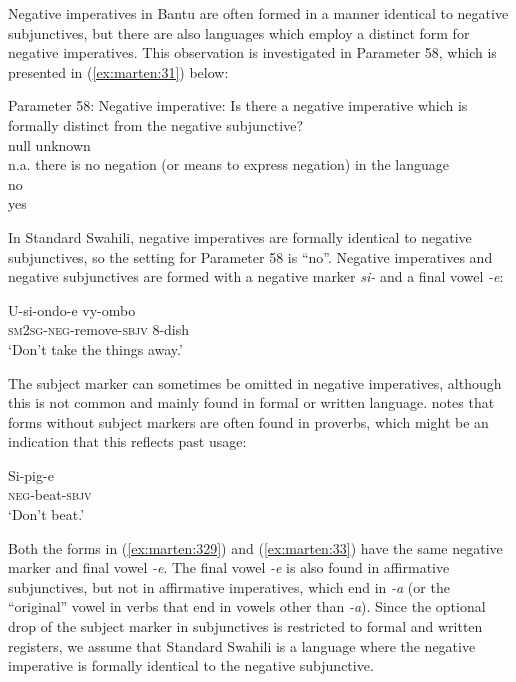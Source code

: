 \documentclass[output=paper]{langscibook}
\begin{document}
Negative imperatives in Bantu are often formed in a manner identical to negative subjunctives, but there are also languages which employ a distinct form for negative imperatives. This observation is investigated in Parameter 58, which is presented in (\ref{ex:marten:31}) below:

\ea\label{ex:marten:31}Parameter 58: Negative imperative: Is there a negative imperative which is formally distinct from the negative subjunctive? \\
\gllll null    unknown\\
n.a.     {there is no negation (or means to express negation) in the language}\\
no {}\\
yes {}\\
\z

In Standard Swahili, negative imperatives are formally identical to negative subjunctives, so the setting for Parameter 58 is ``no''.  Negative imperatives and negative subjunctives are formed with a negative marker \textit{{}si-} and a final vowel \textit{{}-e}:

\ea\label{ex:marten:329} \gll U-si-ondo-e         vy-ombo\\
\textsc{sm2sg-neg}{}-remove-\textsc{sbjv}  8-dish \\
\glt ‘Don’t take the things away.’ \citep[119]{Ashton1947}
\z

The subject marker can sometimes be omitted in negative imperatives, although this is not common and mainly found in formal or written language. \citet[119]{Ashton1947} notes that forms without subject markers are often found in proverbs, which might be an indication that this reflects past usage: 

\ea\label{ex:marten:33}\gll Si-pig-e\\
\textsc{neg}{}-beat-\textsc{sbjv} \\
\glt ‘Don’t beat.’ \citep[119]{Ashton1947}
\z

Both the forms in (\ref{ex:marten:329}) and (\ref{ex:marten:33}) have the same negative marker and final vowel \textit{{}-e}. The final vowel \textit{{}-e} is also found in affirmative subjunctives, but not in affirmative imperatives, which end in \textit{{}-a} (or the ``original'' vowel in verbs that end in vowels other than \textit{{}-a}). Since the optional drop of the subject marker in subjunctives is restricted to formal and written registers, we assume that Standard Swahili is a language where the negative imperative is formally identical to the negative subjunctive. 
\end{document}
